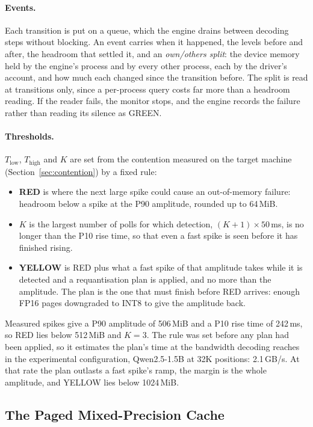 \documentclass[11pt]{article}
\begin{document}
\paragraph{Events.} Each transition is put on a queue, which the engine drains
between decoding steps without blocking. An event carries when it happened,
the levels before and after, the headroom that settled it, and an
\textit{own/others split}: the device memory held by the engine's process and
by every other process, each by the driver's account, and how much each changed
since the transition before. The split is read at transitions only, since a
per-process query costs far more than a headroom reading. If the reader fails,
the monitor stops, and the engine records the failure rather than reading its
silence as GREEN.

\paragraph{Thresholds.} $T_\mathrm{low}$, $T_\mathrm{high}$ and $K$ are set from
the contention measured on the target machine (Section~\ref{sec:contention}) by
a fixed rule:
\begin{itemize}
\item \textbf{RED} is where the next large spike could cause an out-of-memory
failure: headroom below a spike at the P90 amplitude, rounded up to 64\,MiB.
\item \textbf{$K$} is the largest number of polls for which detection,
$(K+1) \times 50$\,ms, is no longer than the P10 rise time, so that even a fast
spike is seen before it has finished rising.
\item \textbf{YELLOW} is RED plus what a fast spike of that amplitude takes while
it is detected and a requantisation plan is applied, and no more than the
amplitude. The plan is the one that must finish before RED arrives: enough FP16
pages downgraded to INT8 to give the amplitude back.
\end{itemize}
Measured spikes give a P90 amplitude of 506\,MiB and a P10 rise time of 242\,ms,
so RED lies below 512\,MiB and $K = 3$. The rule was set before any plan had
been applied, so it estimates the plan's time at the bandwidth decoding reaches
in the experimental configuration, Qwen2.5-1.5B at 32K positions: 2.1\,GB/s. At that
rate the plan outlasts a fast spike's ramp, the margin is the whole amplitude,
and YELLOW lies below 1024\,MiB.

\subsection{The Paged Mixed-Precision Cache}
\label{sec:cache}
\end{document}
